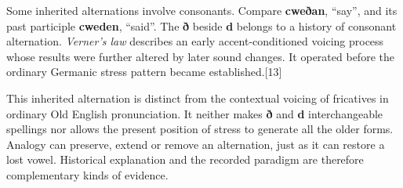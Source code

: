 Some inherited alternations involve consonants. Compare \textbf{cweðan}, “say”, and its past participle \textbf{cweden}, “said”. The \textbf{ð} beside \textbf{d} belongs to a history of consonant alternation. \emph{Verner’s law} describes an early accent-conditioned voicing process whose results were further altered by later sound changes. It operated before the ordinary Germanic stress pattern became established.[13]\par
This inherited alternation is distinct from the contextual voicing of fricatives in ordinary Old English pronunciation. It neither makes \textbf{ð} and \textbf{d} interchangeable spellings nor allows the present position of stress to generate all the older forms. Analogy can preserve, extend or remove an alternation, just as it can restore a lost vowel. Historical explanation and the recorded paradigm are therefore complementary kinds of evidence.\par
